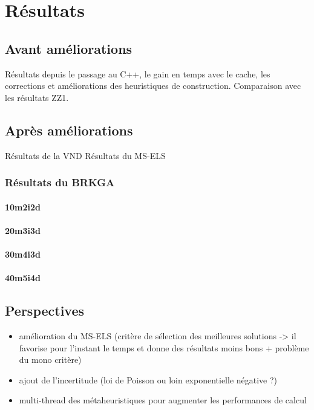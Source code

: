 \chapter{Résultats}
    \section{Avant améliorations}
    	Résultats depuis le passage au C++, le gain en temps avec le cache, les corrections et améliorations des heuristiques de construction.
    	Comparaison avec les résultats ZZ1.
    \section{Après améliorations}
    	Résultats de la VND
    	Résultats du MS-ELS
    	\subsection{Résultats du BRKGA}
            \subsubsection{10m2i2d}
                
                
                
            \subsubsection{20m3i3d}
                
                
                
            \subsubsection{30m4i3d}
                
                
                
            \subsubsection{40m5i4d}
                
                
                


    \section{Perspectives}
    
    	\begin{itemize}
    		\item amélioration du MS-ELS (critère de sélection des meilleures solutions -> il favorise pour l'instant le temps et donne des résultats moins bons + problème du mono critère)
    		\item ajout de l'incertitude (loi de Poisson ou loin exponentielle négative ?)
    		\item multi-thread des métaheuristiques pour augmenter les performances de calcul
    	\end{itemize}
    		
